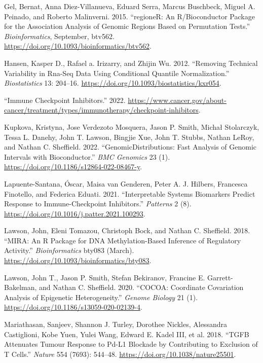 \begin{thebibliography}{99.}
Gel, Bernat, Anna Diez-Villanueva, Eduard Serra, Marcus Buschbeck, Miguel A. Peinado, and Roberto Malinverni. 2015. ``regioneR: An R/Bioconductor Package for the Association Analysis of Genomic Regions Based on Permutation Tests.'' \emph{Bioinformatics}, September, btv562. \url{https://doi.org/10.1093/bioinformatics/btv562}.

Hansen, Kasper D., Rafael a. Irizarry, and Zhijin Wu. 2012. ``Removing Technical Variability in Rna-Seq Data Using Conditional Quantile Normalization.'' \emph{Biostatistics} 13: 204--16. \url{https://doi.org/10.1093/biostatistics/kxr054}.

``Immune Checkpoint Inhibitors.'' 2022. \url{https://www.cancer.gov/about-cancer/treatment/types/immunotherapy/checkpoint-inhibitors}.

Kupkova, Kristyna, Jose Verdezoto Mosquera, Jason P. Smith, Michał Stolarczyk, Tessa L. Danehy, John T. Lawson, Bingjie Xue, John T. Stubbs, Nathan LeRoy, and Nathan C. Sheffield. 2022. ``GenomicDistributions: Fast Analysis of Genomic Intervals with Bioconductor.'' \emph{BMC Genomics} 23 (1). \url{https://doi.org/10.1186/s12864-022-08467-y}.

Lapuente-Santana, Óscar, Maisa van Genderen, Peter A. J. Hilbers, Francesca Finotello, and Federica Eduati. 2021. ``Interpretable Systems Biomarkers Predict Response to Immune-Checkpoint Inhibitors.'' \emph{Patterns} 2 (8). \url{https://doi.org/10.1016/j.patter.2021.100293}.

Lawson, John, Eleni Tomazou, Christoph Bock, and Nathan C. Sheffield. 2018. ``MIRA: An R Package for DNA Methylation-Based Inference of Regulatory Activity.'' \emph{Bioinformatics} bty083 (March). \url{https://doi.org/10.1093/bioinformatics/bty083}.

Lawson, John T., Jason P. Smith, Stefan Bekiranov, Francine E. Garrett-Bakelman, and Nathan C. Sheffield. 2020. ``COCOA: Coordinate Covariation Analysis of Epigenetic Heterogeneity.'' \emph{Genome Biology} 21 (1). \url{https://doi.org/10.1186/s13059-020-02139-4}.

Mariathasan, Sanjeev, Shannon J. Turley, Dorothee Nickles, Alessandra Castiglioni, Kobe Yuen, Yulei Wang, Edward E. Kadel III, et al. 2018. ``TGFB Attenuates Tumour Response to Pd-L1 Blockade by Contributing to Exclusion of T Cells.'' \emph{Nature} 554 (7693): 544--48. \url{https://doi.org/10.1038/nature25501}.


\end{thebibliography}

